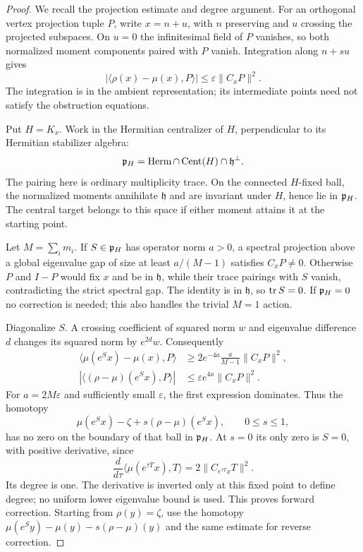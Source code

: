 \begin{proof}
We recall the projection estimate and degree argument.
For an orthogonal vertex projection tuple $P$, write $x=n+u$, with
$n$ preserving and $u$ crossing the projected subspaces. On $u=0$
the infinitesimal field of $P$ vanishes, so both normalized moment
components paired with $P$ vanish. Integration along $n+su$ gives
\begin{equation}\label{eq:projection-error}
 |\langle\rho(x)-\mu(x),P\rangle|
                      \le\varepsilon\|C_xP\|^2 .
\end{equation}
The integration is in the ambient representation; its intermediate
points need not satisfy the obstruction equations.

Put $H=K_x$. Work in the Hermitian centralizer of $H$, perpendicular
to its Hermitian stabilizer algebra:
\[
 \mathfrak p_H=\operatorname{Herm}\cap\operatorname{Cent}(H)\cap\mathfrak h^\perp.
\]
The pairing here is ordinary multiplicity trace.
On the connected $H$-fixed ball, the normalized moments annihilate
$\mathfrak h$ and are invariant under $H$, hence lie in $\mathfrak p_H$.
The central target belongs to this space if either moment attains it
at the starting point.

Let $M=\sum_i m_i$. If $S\in\mathfrak p_H$ has operator norm $a>0$, a
spectral projection above a global eigenvalue gap of size at least
$a/(M-1)$ satisfies $C_xP\ne0$. Otherwise $P$ and $I-P$ would fix
$x$ and be in $\mathfrak h$, while their trace pairings with $S$
vanish, contradicting the strict spectral gap. The identity is in
$\mathfrak h$, so $\operatorname{tr} S=0$. If $\mathfrak p_H=0$ no correction is needed;
this also handles the trivial $M=1$ action.

Diagonalize $S$. A crossing coefficient of squared norm $w$ and
eigenvalue difference $d$ changes its squared norm by $e^{2d}w$.
Consequently
\begin{equation}\label{eq:spectral-cut}
 \begin{split}
 \langle\mu(e^Sx)-\mu(x),P\rangle
       &\ge 2e^{-4a}\frac{a}{M-1}\|C_xP\|^2,\\
 |\langle(\rho-\mu)(e^Sx),P\rangle|
       &\le\varepsilon e^{4a}\|C_xP\|^2 .
 \end{split}
\end{equation}
For $a=2M\varepsilon$ and sufficiently small $\varepsilon$, the
first expression dominates. Thus the homotopy
\[
 \mu(e^Sx)-\zeta+s(\rho-\mu)(e^Sx),\qquad 0\le s\le1,
\]
has no zero on the boundary of that ball in $\mathfrak p_H$. At $s=0$ its
only zero is $S=0$, with positive derivative, since
\[
 \frac{d}{d\tau}\langle\mu(e^{\tau T}x),T\rangle
                   =2\|C_{e^{\tau T}x}T\|^2 .
\]
Its degree is one. The derivative is inverted only at this fixed
point to define degree; no uniform lower eigenvalue bound is used.
This proves forward correction. Starting from $\rho(y)=\zeta$,
use the homotopy
$\mu(e^Sy)-\mu(y)-s(\rho-\mu)(y)$ and the same estimate for reverse
correction.


\end{proof}
